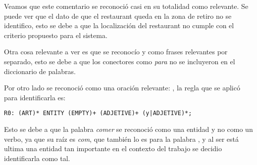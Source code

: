 Veamos que este comentario se reconoció casi en su totalidad como relevante. Se puede ver que el dato de que el restaurant queda en la zona de retiro no se identifico, esto se debe a que la localización del restaurant no cumple con el criterio propuesto para el sistema.

Otra cosa relevante a ver es que se reconocío  y  como frases relevantes por separado, esto se debe a que los conectores como \emph{para} no se incluyeron en el diccionario de palabras.

Por otro lado se reconoció como una oración relevante: , la regla que se aplicó para identificarla es:

\begin{verbatim}
R0: (ART)* ENTITY (EMPTY)+ (ADJETIVE)+ (y|ADJETIVE)*;
\end{verbatim}

Esto se debe a que la palabra \emph{comer} se reconoció como una entidad y no como un verbo, ya que su raíz es \emph{com}, que también lo es para la palabra , y al ser está ultima una entidad tan importante en el contexto del trabajo se decidio identificarla como tal.

